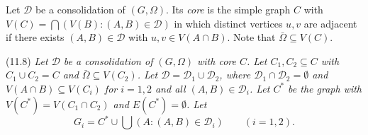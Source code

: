 Let $\mathcal{D}$ be a consolidation of $(G, \Omega)$. Its \textit{core} is the simple graph $C$ with $V(C) = \bigcap (V(B): (A, B) \in \mathcal{D})$ in which distinct vertices $u, v$ are adjacent if there exists $(A, B) \in \mathcal{D}$ with $u, v \in V(A \cap B)$. Note that $\bar{\Omega} \subseteq V(C)$.

\stmt
(11.8) \textit{Let $\mathcal{D}$ be a consolidation of $(G, \Omega)$ with core $C$. Let $C_1, C_2 \subseteq C$ with $C_1 \cup C_2 = C$ and $\bar{\Omega} \subseteq V(C_2)$. Let $\mathcal{D} = \mathcal{D}_1 \cup \mathcal{D}_2$, where $\mathcal{D}_1 \cap \mathcal{D}_2 = \emptyset$ and $V(A \cap B) \subseteq V(C_i)$ for $i = 1, 2$ and all $(A, B) \in \mathcal{D}_i$. Let $C^*$ be the graph with $V(C^*) = V(C_1 \cap C_2)$ and $E(C^*) = \emptyset$. Let}
\begin{equation*}
G_i = C^* \cup \bigcup (A: (A, B) \in \mathcal{D}_i) \qquad (i = 1, 2).
\end{equation*}
